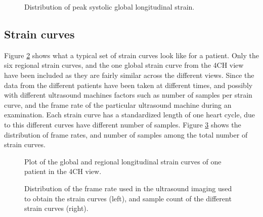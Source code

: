 \begin{figure}
    \centering
    
    \caption{Distribution of peak systolic global longitudinal strain.}
    \label{fig:gls_dist}
\end{figure}

\clearpage

\subsection{Strain curves}
Figure \ref{fig:strain_curves} shows what a typical set of strain curves look like for a patient. 
Only the six regional strain curves, and the one global strain curve from the 4CH view have been included as they are fairly similar across the different views. Since the data from the different patients have been taken at different times, and possibly with different ultrasound machines factors such as number of samples per strain curve, and the frame rate of the particular ultrasound machine during an examination. Each strain curve has a standardized length of one heart cycle, due to this different curves have different number of samples. Figure \ref{fig:fr_sample_dist} shows the distribution of frame rates, and number of samples among the total number of strain curves. \bigskip

\begin{figure}[h]
    \centering
    
    \caption{Plot of the global and regional longitudinal strain curves of one patient in the 4CH view.}
    \label{fig:strain_curves}
\end{figure}

\begin{figure}
    \centering
    
    \caption{Distribution of the frame rate used in the ultrasound imaging used to obtain the strain curves (left), and sample count of the different strain curves (right).}
    \label{fig:fr_sample_dist}
\end{figure}

\newpage

